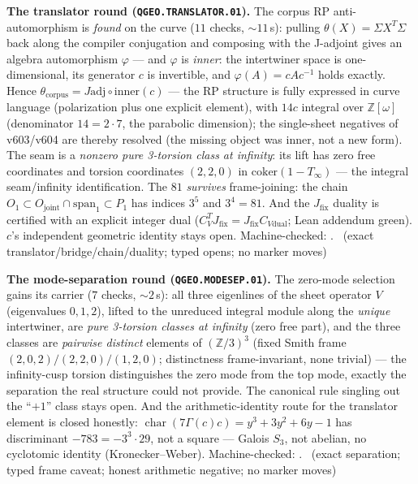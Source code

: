 
\par\smallskip\noindent\textbf{The translator round
(\texttt{QGEO.TRANSLATOR.01}).}
The corpus RP anti-automorphism is \emph{found} on the curve ($11$
checks, ${\sim}11$\,s): pulling $\theta(X)=\Sigma X^T\Sigma$ back
along the compiler conjugation and composing with the J-adjoint gives
an algebra automorphism $\varphi$ --- and $\varphi$ is \emph{inner}:
the intertwiner space is one-dimensional, its generator $c$ is
invertible, and $\varphi(A)=cAc^{-1}$ holds exactly.  Hence
$\theta_{\mathrm{corpus}}=J\mathrm{adj}\circ\mathrm{inner}(c)$ --- the
RP structure is fully expressed in curve language (polarization plus
one explicit element), with $14c$ integral over
$\mathbb{Z}[\omega]$ (denominator $14=2\cdot7$, the parabolic
dimension); the single-sheet negatives of v603/v604 are thereby
resolved (the missing object was inner, not a new form).  The seam is
a \emph{nonzero pure 3-torsion class at infinity}: its lift has zero
free coordinates and torsion coordinates $(2,2,0)$ in
$\mathrm{coker}(1-T_\infty)$ --- the integral seam/infinity
identification.  The $81$ \emph{survives} frame-joining: the chain
$O_1\subset O_{\mathrm{joint}}\cap\mathrm{span}_1\subset P_1$ has
indices $3^5$ and $3^4=81$.  And the $J_{\mathrm{fix}}$ duality is
certified with an explicit integer dual
($C_V^TJ_{\mathrm{fix}}=J_{\mathrm{fix}}C_{V\mathrm{dual}}$; Lean
addendum green).  $c$'s independent geometric identity stays open.
Machine-checked: .
\mE\ (exact translator/bridge/chain/duality; typed opens; no marker
moves)
\par\smallskip

\par\smallskip\noindent\textbf{The mode-separation round
(\texttt{QGEO.MODESEP.01}).}
The zero-mode selection gains its carrier ($7$ checks, ${\sim}2$\,s):
all three eigenlines of the sheet operator $V$ (eigenvalues $0,1,2$),
lifted to the unreduced integral module along the \emph{unique}
intertwiner, are \emph{pure 3-torsion classes at infinity} (zero free
part), and the three classes are \emph{pairwise distinct} elements of
$(\mathbb{Z}/3)^3$ (fixed Smith frame $(2,0,2)/(2,2,0)/(1,2,0)$;
distinctness frame-invariant, none trivial) --- the infinity-cusp
torsion distinguishes the zero mode from the top mode, exactly the
separation the real structure could not provide.  The canonical rule
singling out the ``$+1$'' class stays open.  And the
arithmetic-identity route for the translator element is closed
honestly: $\operatorname{char}(7\Gamma(c)c)=y^3+3y^2+6y-1$ has
discriminant $-783=-3^3\cdot29$, not a square --- Galois $S_3$, not
abelian, no cyclotomic identity (Kronecker--Weber).
Machine-checked: .
\mE\ (exact separation; typed frame caveat; honest arithmetic
negative; no marker moves)
\par\smallskip

